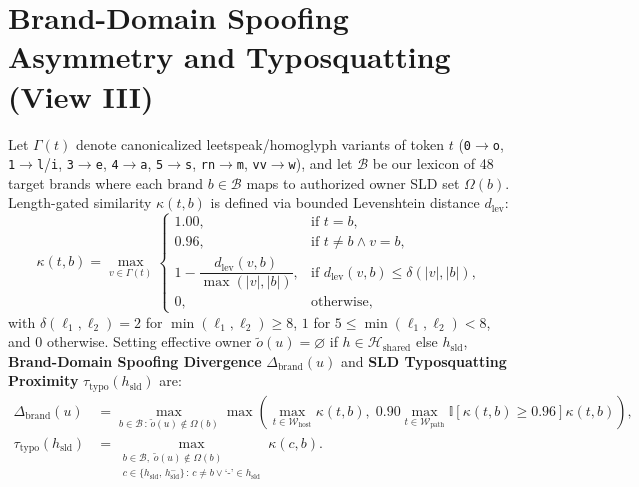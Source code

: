 \documentclass[12pt,a4paper]{report}
\begin{document}
\section[Brand-Domain Spoofing Asymmetry \& Typosquatting]{Brand-Domain Spoofing Asymmetry and Typosquatting (View III)}
Let $\Gamma(t)$ denote canonicalized leetspeak/homoglyph variants of token $t$ (\texttt{0}$\to$\texttt{o}, \texttt{1}$\to$\texttt{l}/\texttt{i}, \texttt{3}$\to$\texttt{e}, \texttt{4}$\to$\texttt{a}, \texttt{5}$\to$\texttt{s}, \texttt{rn}$\to$\texttt{m}, \texttt{vv}$\to$\texttt{w}), and let $\mathcal{B}$ be our lexicon of 48 target brands where each brand $b \in \mathcal{B}$ maps to authorized owner SLD set $\Omega(b)$. Length-gated similarity $\kappa(t,b)$ is defined via bounded Levenshtein distance $d_{\text{lev}}$:
\begin{equation}
\kappa(t, b) = \max_{v \in \Gamma(t)}
\begin{cases}
1.00, & \text{if } t = b, \\
0.96, & \text{if } t \neq b \land v = b, \\
1 - \dfrac{d_{\text{lev}}(v, b)}{\max(|v|, |b|)}, & \text{if } d_{\text{lev}}(v,b) \le \delta(|v|,|b|), \\
0, & \text{otherwise},
\end{cases}
\end{equation}
with $\delta(\ell_1,\ell_2) = 2$ for $\min(\ell_1,\ell_2) \ge 8$, $1$ for $5 \le \min(\ell_1,\ell_2) < 8$, and $0$ otherwise. Setting effective owner $\tilde{o}(u) = \varnothing$ if $h \in \mathcal{H}_{\text{shared}}$ else $h_{\text{sld}}$, \textbf{Brand-Domain Spoofing Divergence} $\Delta_{\text{brand}}(u)$ and \textbf{SLD Typosquatting Proximity} $\tau_{\text{typo}}(h_{\text{sld}})$ are:
\begin{align}
\Delta_{\text{brand}}(u) &= \max_{b \in \mathcal{B} \,:\, \tilde{o}(u) \notin \Omega(b)} \max\!\left( \max_{t \in \mathcal{W}_{\text{host}}} \kappa(t,b),\; 0.90 \!\!\max_{t \in \mathcal{W}_{\text{path}}} \mathbb{I}[\kappa(t,b) \ge 0.96]\kappa(t,b) \right), \\
\tau_{\text{typo}}(h_{\text{sld}}) &= \max_{\substack{b \in \mathcal{B},\; \tilde{o}(u) \notin \Omega(b) \\ c \in \{h_{\text{sld}},\, h_{\text{sld}}^{-}\} \,:\, c \neq b \lor \text{`-'}\in h_{\text{sld}}}} \kappa(c, b).
\end{align}
\end{document}
